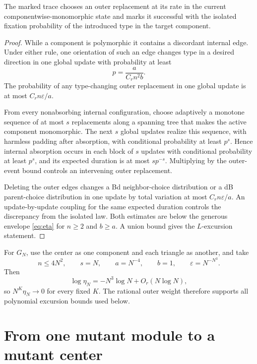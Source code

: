 \documentclass[11pt]{article}
\theoremstyle{definition}
\theoremstyle{remark}
\newcommand{\eps}{\varepsilon}
\begin{document}
The marked trace chooses an outer replacement at its rate in the current
componentwise-monomorphic state and marks it successful with the isolated
fixation probability of the introduced type in the target component.

\begin{proof}
While a component is polymorphic it contains a discordant internal edge.
Under either rule, one orientation of such an edge changes type in a desired
direction in one global update with probability at least
\begin{equation}
 p=\frac{a}{C_rn^2b}.
 \label{eq:p-internal}
\end{equation}
The probability of any type-changing outer replacement in one global update
is at most $C_rn\eps/a$.

From every nonabsorbing internal configuration, choose adaptively a monotone
sequence of at most $s$ replacements along a spanning tree that makes the
active component monomorphic.  The next $s$ global updates realize this
sequence, with harmless padding after absorption, with conditional
probability at least $p^s$.  Hence internal absorption occurs in each block
of $s$ updates with conditional probability at least $p^s$, and its expected
duration is at most $sp^{-s}$.  Multiplying by the outer-event bound controls
an intervening outer replacement.

Deleting the outer edges changes a Bd neighbor-choice distribution or a dB
parent-choice distribution in one update by total variation at most
$C_rn\eps/a$.  An update-by-update coupling for the same expected duration
controls the discrepancy from the isolated law.  Both estimates are below
the generous envelope \eqref{eq:eta} for $n\geq2$ and $b\geq a$.  A union
bound gives the $L$-excursion statement.
\end{proof}

For $G_N$, use the center as one component and each triangle as another, and
take
\begin{equation}
 n\leq4N^2,\qquad s=N,\qquad a=N^{-4},\qquad b=1,
 \qquad\eps=N^{-N^3}.
 \label{eq:rare-substitution}
\end{equation}
Then
\begin{equation}
 \log\eta_N=-N^3\log N+O_r(N\log N),
 \label{eq:eta-asymptotic}
\end{equation}
so $N^K\eta_N\to0$ for every fixed $K$.  The rational outer weight therefore
supports all polynomial excursion bounds used below.

\section{From one mutant module to a mutant center}
\end{document}
